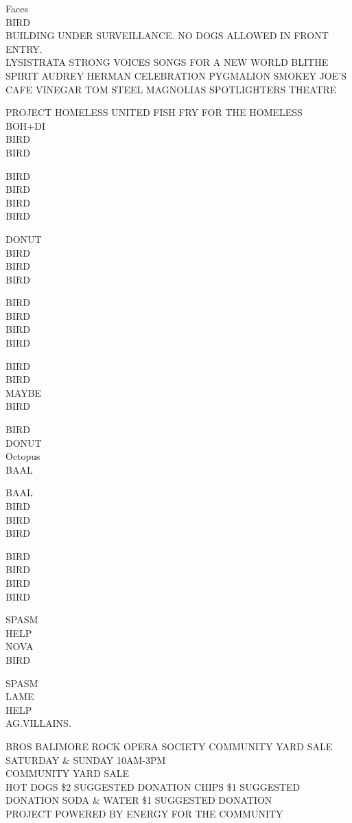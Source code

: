 \documentclass[10pt,letterpaper]{article}
\begin{document}
Faces\\
BIRD\\
BUILDING UNDER SURVEILLANCE.  NO DOGS ALLOWED IN FRONT ENTRY.\\
LYSISTRATA STRONG VOICES SONGS FOR A NEW WORLD BLITHE SPIRIT AUDREY HERMAN CELEBRATION PYGMALION SMOKEY JOE'S CAFE VINEGAR TOM STEEL MAGNOLIAS SPOTLIGHTERS THEATRE

PROJECT HOMELESS UNITED FISH FRY FOR THE HOMELESS\\
BOH+DI\\
BIRD\\
BIRD

BIRD\\
BIRD\\
BIRD\\
BIRD

DONUT\\
BIRD\\
BIRD\\
BIRD

BIRD\\
BIRD\\
BIRD\\
BIRD

BIRD\\
BIRD\\
MAYBE\\
BIRD

BIRD\\
DONUT\\
Octopus\\
BAAL

BAAL\\
BIRD\\
BIRD\\
BIRD

BIRD\\
BIRD\\
BIRD\\
BIRD

SPASM\\
HELP\\
NOVA\\
BIRD

SPASM\\
LAME\\
HELP\\
AG.VILLAINS.

BROS BALIMORE ROCK OPERA SOCIETY COMMUNITY YARD SALE SATURDAY \& SUNDAY 10AM{-}3PM\\
COMMUNITY YARD SALE\\
HOT DOGS \$2 SUGGESTED DONATION CHIPS \$1 SUGGESTED DONATION SODA \& WATER \$1 SUGGESTED DONATION\\
PROJECT POWERED BY ENERGY FOR THE COMMUNITY
\end{document}
